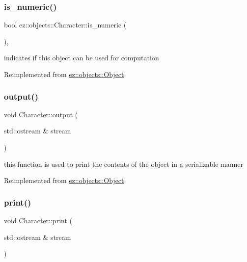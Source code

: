 \subsubsection{\texorpdfstring{is\+\_\+numeric()}{is\_numeric()}}
{\footnotesize\ttfamily bool ez\+::objects\+::\+Character\+::is\+\_\+numeric (\begin{DoxyParamCaption}{ }\end{DoxyParamCaption})\hspace{0.3cm}{\ttfamily [inline]}, {\ttfamily [virtual]}}

indicates if this object can be used for computation 

Reimplemented from \hyperlink{classez_1_1objects_1_1Object_a19ba1672d4063232c4619e016ca178f8}{ez\+::objects\+::\+Object}.

\mbox{\label{classez_1_1objects_1_1Character_ab72c114740fab4824d691d6219e07a67}} 
\subsubsection{\texorpdfstring{output()}{output()}}
{\footnotesize\ttfamily void Character\+::output (\begin{DoxyParamCaption}\item[{std\+::ostream \&}]{stream }\end{DoxyParamCaption})\hspace{0.3cm}{\ttfamily [virtual]}}

this function is used to print the contents of the object in a serializable manner 

Reimplemented from \hyperlink{classez_1_1objects_1_1Object_a0fdfe18e6c35d6b0d7e7a01265aded15}{ez\+::objects\+::\+Object}.

\mbox{\label{classez_1_1objects_1_1Character_abf2e9f190594d03005b1cd0610f2f38c}} 
\subsubsection{\texorpdfstring{print()}{print()}}
{\footnotesize\ttfamily void Character\+::print (\begin{DoxyParamCaption}\item[{std\+::ostream \&}]{stream }\end{DoxyParamCaption})\hspace{0.3cm}{\ttfamily [virtual]}}

